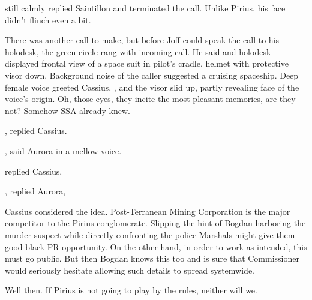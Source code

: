  still calmly replied Saintillon and terminated the call. Unlike Pirius, his face didn't flinch even a bit.

There was another call to make, but before Joff could speak the call to his holodesk, the green circle rang with incoming call. He said  and holodesk displayed frontal view of a space suit in pilot's cradle, helmet with protective visor down. Background noise of the caller suggested a cruising spaceship. Deep female voice greeted Cassius, , and the visor slid up, partly revealing face of the voice's origin. Oh, those eyes, they incite the most pleasant memories, are they not? Somehow SSA already knew.

, replied Cassius.

, said Aurora in a mellow voice.

 replied Cassius, 

, replied Aurora, 

Cassius considered the idea. Post-Terranean Mining Corporation is the major competitor to the Pirius conglomerate. Slipping the hint of Bogdan harboring the murder suspect while directly confronting the police Marshals might give them good black PR opportunity. On the other hand, in order to work as intended, this must go public. But then Bogdan knows this too and is sure that Commissioner would seriously hesitate allowing such details to spread systemwide.



Well then. If Pirius is not going to play by the rules, neither will we.

